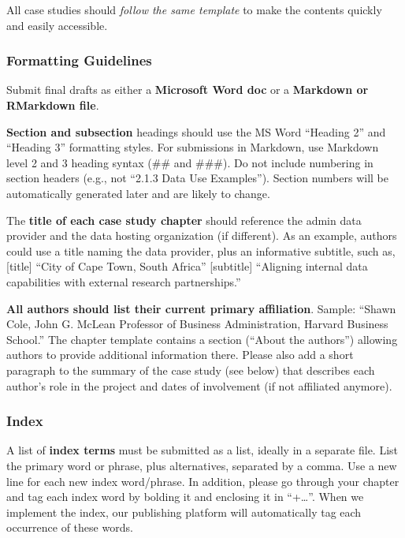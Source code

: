 \documentclass[
]{WileySix}
\begin{document}
All case studies should \emph{follow the same template} to make the contents quickly and easily accessible.

\hypertarget{formatting-guidelines}{%
\subsubsection*{Formatting Guidelines}\label{formatting-guidelines}}

Submit final drafts as either a \textbf{Microsoft Word doc} or a \textbf{Markdown or RMarkdown file}.

\textbf{Section and subsection} headings should use the MS Word ``Heading 2'' and ``Heading 3'' formatting styles. For submissions in Markdown, use Markdown level 2 and 3 heading syntax (\#\# and \#\#\#). Do not include numbering in section headers (e.g., not ``2.1.3 Data Use Examples''). Section numbers will be automatically generated later and are likely to change.

The \textbf{title of each case study chapter} should reference the admin data provider and the data hosting organization (if different). As an example, authors could use a title naming the data provider, plus an informative subtitle, such as, {[}title{]} ``City of Cape Town, South Africa'' {[}subtitle{]} ``Aligning internal data capabilities with external research partnerships.''

\textbf{All authors should list their current primary affiliation}. Sample: ``Shawn Cole, John G. McLean Professor of Business Administration, Harvard Business School.'' The chapter template contains a section (``About the authors'') allowing authors to provide additional information there. Please also add a short paragraph to the summary of the case study (see below) that describes each author's role in the project and dates of involvement (if not affiliated anymore).

\hypertarget{index}{%
\subsubsection*{Index}\label{index}}

A list of \textbf{index terms} must be submitted as a list, ideally in a separate file. List the primary word or phrase, plus alternatives, separated by a comma. Use a new line for each new index word/phrase. In addition, please go through your chapter and tag each index word by bolding it and enclosing it in ``+\ldots\textbar{}''. When we implement the index, our publishing platform will automatically tag each occurrence of these words.
\end{document}
